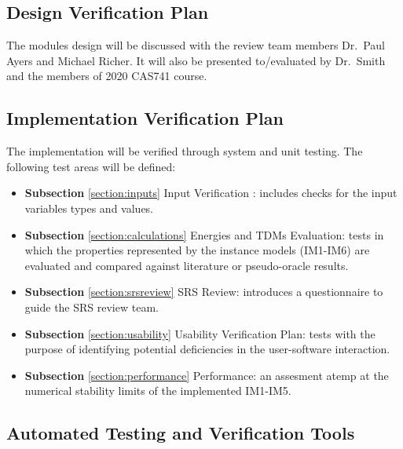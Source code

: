 \documentclass[12pt, titlepage]{article}
\begin{document}
\subsection{Design Verification Plan}

The modules design will be discussed with the review team members Dr.\ Paul 
Ayers and Michael Richer. It will also be presented to/evaluated by Dr.\ Smith 
and the members of 2020 CAS741 course.

\subsection{Implementation Verification Plan}

%
The implementation will be verified through system and unit testing. The 
following test areas will be defined:
\begin{itemize}
	\item \textbf{Subsection} \ref{section:inputs} Input Verification : 
	includes 
	checks for the input variables types and values.
	\item \textbf{Subsection} 
	\ref{section:calculations} Energies and TDMs Evaluation: tests in 
	which the properties represented by the instance models (IM1-IM6) are 
	evaluated and compared against literature or pseudo-oracle results.
	\item \textbf{Subsection} \ref{section:srsreview} SRS Review: 
	introduces a questionnaire to guide the SRS review team.
	\item \textbf{Subsection} \ref{section:usability} Usability Verification 
	Plan: 
	tests with the purpose of identifying potential deficiencies in the 
	user-software interaction.
	\item \textbf{Subsection} \ref{section:performance} Performance: an 
	assesment 
	atemp at the numerical stability limits of the implemented IM1-IM5.
\end{itemize}


\subsection{Automated Testing and Verification Tools}
\end{document}
